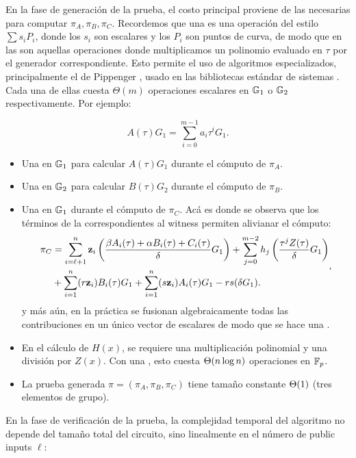 En la fase de generación de la prueba, el costo principal proviene de las \MSM necesarias para computar $\pi_A, \pi_B, \pi_C$. Recordemos que una \MSM es una operación del estilo $\sum s_i P_i$, donde los $s_i$ son escalares y los $P_i$ son puntos de curva, de modo que en \Groth las \MSM son aquellas operaciones donde multiplicamos un polinomio evaluado en $\tau$ por el generador correspondiente. Esto permite el uso de algoritmos especializados, principalmente el de Pippenger \cite{Pippenger1976}, usado en las bibliotecas estándar de sistemas \zkSNARK \cite{gnark, arkworks, bellman}. Cada una de ellas cuesta $\Theta(m)$ operaciones escalares en $\mathbb{G}_1$ o $\mathbb{G}_2$ respectivamente. Por ejemplo:

$$A(\tau) G_1 = \sum_{i=0}^{m - 1} a_i \tau^i G_1.$$

\begin{itemize}[itemsep = 0.1 cm]
	\item Una \MSM en $\mathbb{G}_1$ para calcular $A(\tau) G_1$ durante el cómputo de $\pi_A$.
	\item Una \MSM en $\mathbb{G}_2$ para calcular $B(\tau) G_2$ durante el cómputo de $\pi_B$.
	\item Una \MSM en $\mathbb{G}_1$ durante el cómputo de $\pi_C$. Acá es donde se observa que los términos de la \SRS correspondientes al witness permiten alivianar el cómputo:
	$$\begin{aligned}
		\pi_C &= \sum_{i=\ell+1}^{n} \mathbf{z}_i \left(\frac{\beta A_i(\tau) + \alpha B_i(\tau) + C_i(\tau)}{\delta} G_1 \right) + \sum_{j=0}^{m-2} h_j \left(\frac{\tau^j Z(\tau)}{\delta} G_1 \right) \\
		&+ \sum_{i=1}^{n} (r\mathbf{z}_i) B_i(\tau) G_1 + \sum_{i=1}^{n} (s\mathbf{z}_i) A_i(\tau) G_1 - rs(\delta G_1).
	\end{aligned},$$
	y más aún, en la práctica se fusionan algebraicamente todas las contribuciones en un único vector de escalares de modo que se hace una \MSM.
	\item En el cálculo de $H(x)$, se requiere una multiplicación polinomial y una división por $Z(x)$. Con una \FFT, esto cuesta $\Theta(n \log n)$ operaciones en $\mathbb{F}_p$.
	\item La prueba generada $\pi = (\pi_A, \pi_B, \pi_C)$ tiene tamaño constante $\Theta(1)$ (tres elementos de grupo).
\end{itemize}

En la fase de verificación de la prueba, la complejidad temporal del algoritmo no depende del tamaño total del circuito, sino linealmente en el número de public inputs $\ell$:

